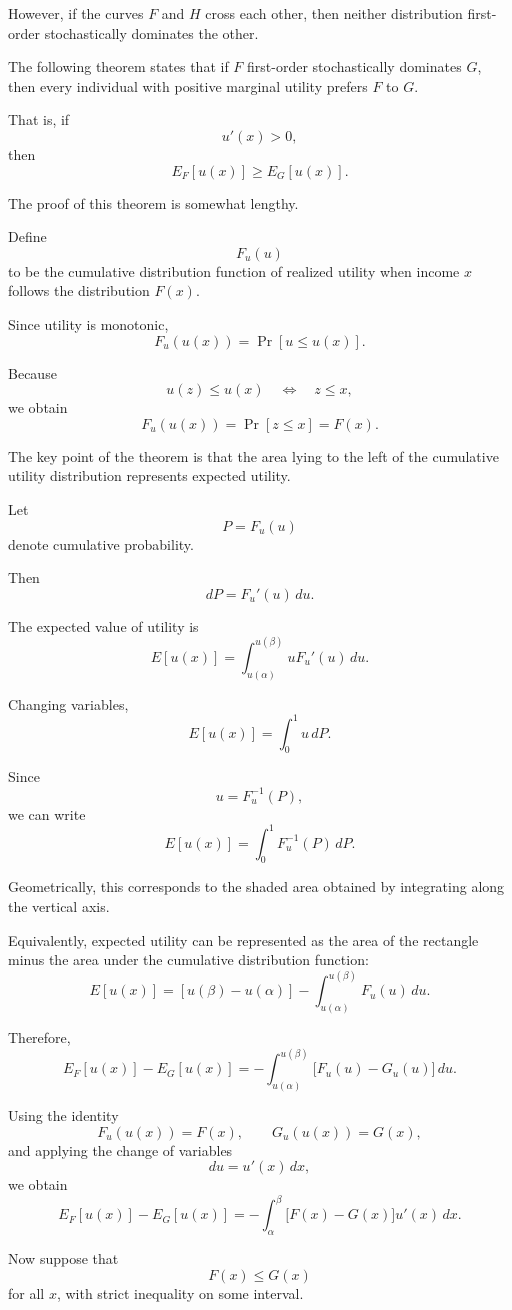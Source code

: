 However, if the curves \(F\) and \(H\) cross each other, then neither distribution first-order stochastically dominates the other.

The following theorem states that if \(F\) first-order stochastically dominates \(G\), then every individual with positive marginal utility prefers \(F\) to \(G\).

That is, if
\[
u'(x)>0,
\]
then
\[
E_F[u(x)]
\ge
E_G[u(x)].
\]



The proof of this theorem is somewhat lengthy.

Define
\[
F_u(u)
\]
to be the cumulative distribution function of realized utility when income \(x\) follows the distribution \(F(x)\).

Since utility is monotonic,
\[
F_u(u(x))
=
\Pr[u\le u(x)].
\]

Because
\[
u(z)\le u(x)
\quad\Longleftrightarrow\quad
z\le x,
\]
we obtain
\[
F_u(u(x))
=
\Pr[z\le x]
=
F(x).
\]

The key point of the theorem is that the area lying to the left of the cumulative utility distribution represents expected utility.

Let
\[
P=F_u(u)
\]
denote cumulative probability.

Then
\[
dP
=
F_u'(u)\,du.
\]

The expected value of utility is
\[
E[u(x)]
=
\int_{u(\alpha)}^{u(\beta)}
uF_u'(u)\,du.
\]

Changing variables,
\[
E[u(x)]
=
\int_0^1 u\,dP.
\]

Since
\[
u=F_u^{-1}(P),
\]
we can write
\[
E[u(x)]
=
\int_0^1 F_u^{-1}(P)\,dP.
\]

Geometrically, this corresponds to the shaded area obtained by integrating along the vertical axis.

Equivalently, expected utility can be represented as the area of the rectangle minus the area under the cumulative distribution function:
\[
E[u(x)]
=
[u(\beta)-u(\alpha)]
-
\int_{u(\alpha)}^{u(\beta)}
F_u(u)\,du.
\]

Therefore,
\[
E_F[u(x)]
-
E_G[u(x)]
=
-
\int_{u(\alpha)}^{u(\beta)}
\bigl[
F_u(u)-G_u(u)
\bigr]\,du.
\]

Using the identity
\[
F_u(u(x))=F(x),
\qquad
G_u(u(x))=G(x),
\]
and applying the change of variables
\[
du=u'(x)\,dx,
\]
we obtain
\[
E_F[u(x)]
-
E_G[u(x)]
=
-
\int_{\alpha}^{\beta}
\bigl[
F(x)-G(x)
\bigr]
u'(x)\,dx.
\]

Now suppose that
\[
F(x)\le G(x)
\]
for all \(x\), with strict inequality on some interval.

